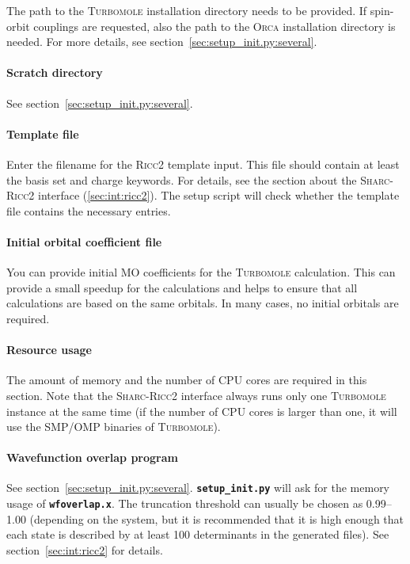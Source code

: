 \documentclass[a4paper,10pt,DIV=15,openany]{scrbook}
\newcommand{\sharc}{\textsc{Sharc}}
\newcommand{\ttt}[1]{\textbf{\texttt{#1}}}
\begin{document}
The path to the \textsc{Turbomole} installation directory needs to be provided.
If spin-orbit couplings are requested, also the path to the \textsc{Orca} installation directory is needed.
For more details, see section~\ref{sec:setup_init.py:several}.

\paragraph{Scratch directory}

See section~\ref{sec:setup_init.py:several}.

\paragraph{Template file}

Enter the filename for the \textsc{Ricc2} template input. This file should contain at least the basis set and charge keywords. For details, see the section about the \sharc-\textsc{Ricc2} interface (\ref{sec:int:ricc2}). The setup script will check whether the template file contains the necessary entries. 

\paragraph{Initial orbital coefficient file}

You can provide initial MO coefficients for the \textsc{Turbomole} calculation. This can provide a small speedup for the calculations and helps to ensure that all calculations are based on the same orbitals.
In many cases, no initial orbitals are required.

\paragraph{Resource usage}

The amount of memory and the number of CPU cores are required in this section.
Note that the \sharc-\textsc{Ricc2} interface always runs only one \textsc{Turbomole} instance at the same time (if the number of CPU cores is larger than one, it will use the SMP/OMP binaries of \textsc{Turbomole}).

\paragraph{Wavefunction overlap program}

See section~\ref{sec:setup_init.py:several}. \ttt{setup\_init.py} will ask for the memory usage of \ttt{wfoverlap.x}. The truncation threshold can usually be chosen as 0.99--1.00 (depending on the system, but it is recommended that it is high enough that each state is described by at least 100 determinants in the generated files). See section~\ref{sec:int:ricc2} for details.
\end{document}
